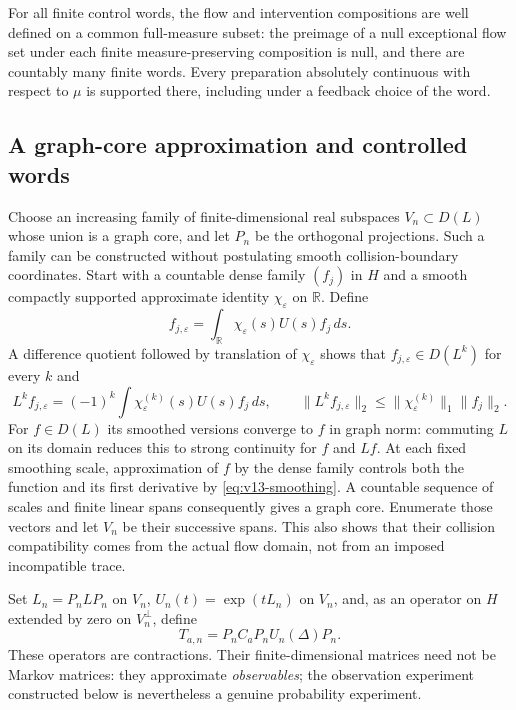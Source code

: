 For all finite control words, the flow and intervention compositions
are well defined on a common full-measure subset: the preimage of a
null exceptional flow set under each finite measure-preserving
composition is null, and there are countably many finite words.
Every preparation absolutely continuous with respect to $\mu$ is
supported there, including under a feedback choice of the word.

\subsection{A graph-core approximation and controlled words}
Choose an increasing family of finite-dimensional real subspaces
$V_n\subset D(L)$ whose union is a graph core, and let $P_n$ be the
orthogonal projections. Such a family can be constructed without
postulating smooth collision-boundary coordinates. Start with a
countable dense family $(f_j)$ in $H$ and a smooth compactly supported
approximate identity $\chi_\varepsilon$ on $\mathbb R$. Define
\[
 f_{j,\varepsilon}=\int_{\mathbb R}\chi_\varepsilon(s)U(s)f_j\,ds.
\]
A difference quotient followed by translation of $\chi_\varepsilon$
shows that $f_{j,\varepsilon}\in D(L^k)$ for every $k$ and
\begin{equation}\label{eq:v13-smoothing}
 L^kf_{j,\varepsilon}=(-1)^k\int
               \chi_\varepsilon^{(k)}(s)U(s)f_j\,ds,
 \qquad
 \|L^kf_{j,\varepsilon}\|_2
            \le\|\chi_\varepsilon^{(k)}\|_1\|f_j\|_2.
\end{equation}
For $f\in D(L)$ its smoothed versions converge to $f$ in graph norm:
commuting $L$ on its domain reduces this to strong continuity for $f$
and $Lf$. At each fixed smoothing scale, approximation of $f$ by the
dense family controls both the function and its first derivative by
\eqref{eq:v13-smoothing}. A countable sequence of scales and finite
linear spans consequently gives a graph core. Enumerate those vectors
and let $V_n$ be their successive spans. This also shows that their
collision compatibility comes from the actual flow domain, not from
an imposed incompatible trace.

Set $L_n=P_nLP_n$ on $V_n$, $U_n(t)=\exp(tL_n)$ on $V_n$, and, as an
operator on $H$ extended by zero on $V_n^\perp$, define
\begin{equation}\label{eq:v13-approxword}
 T_{a,n}=P_nC_aP_nU_n(\Delta)P_n.
\end{equation}
These operators are contractions. Their finite-dimensional matrices
need not be Markov matrices: they approximate \emph{observables}; the
observation experiment constructed below is nevertheless a genuine
probability experiment.

